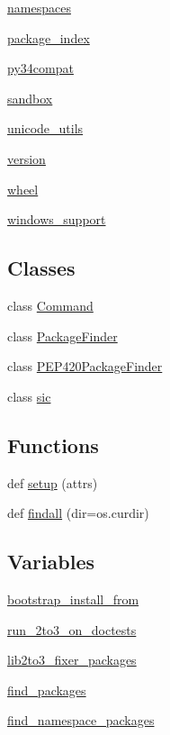 \begin{DoxyCompactItemize}
\item 
 \hyperlink{namespacesetuptools_1_1namespaces}{namespaces}
\item 
 \hyperlink{namespacesetuptools_1_1package__index}{package\+\_\+index}
\item 
 \hyperlink{namespacesetuptools_1_1py34compat}{py34compat}
\item 
 \hyperlink{namespacesetuptools_1_1sandbox}{sandbox}
\item 
 \hyperlink{namespacesetuptools_1_1unicode__utils}{unicode\+\_\+utils}
\item 
 \hyperlink{namespacesetuptools_1_1version}{version}
\item 
 \hyperlink{namespacesetuptools_1_1wheel}{wheel}
\item 
 \hyperlink{namespacesetuptools_1_1windows__support}{windows\+\_\+support}
\end{DoxyCompactItemize}
\subsection*{Classes}
\begin{DoxyCompactItemize}
\item 
class \hyperlink{classsetuptools_1_1Command}{Command}
\item 
class \hyperlink{classsetuptools_1_1PackageFinder}{Package\+Finder}
\item 
class \hyperlink{classsetuptools_1_1PEP420PackageFinder}{P\+E\+P420\+Package\+Finder}
\item 
class \hyperlink{classsetuptools_1_1sic}{sic}
\end{DoxyCompactItemize}
\subsection*{Functions}
\begin{DoxyCompactItemize}
\item 
def \hyperlink{namespacesetuptools_ad048bb82cb20bf61541da45950f1f4cb}{setup} (attrs)
\item 
def \hyperlink{namespacesetuptools_a9d3e6b5f82f1d22fb1d7ad0daf6018f6}{findall} (dir=os.\+curdir)
\end{DoxyCompactItemize}
\subsection*{Variables}
\begin{DoxyCompactItemize}
\item 
\hyperlink{namespacesetuptools_a7d51d85e64a02e0808685340753eec38}{bootstrap\+\_\+install\+\_\+from}
\item 
\hyperlink{namespacesetuptools_a02cbd18fe112cad981fe27383fd1ee93}{run\+\_\+2to3\+\_\+on\+\_\+doctests}
\item 
\hyperlink{namespacesetuptools_ab9549f600e3f3e095fc7b60354269255}{lib2to3\+\_\+fixer\+\_\+packages}
\item 
\hyperlink{namespacesetuptools_af3f752d8ed43dd0bf1640292cf7f2540}{find\+\_\+packages}
\item 
\hyperlink{namespacesetuptools_aca679eba14fa84f44af47d19f837694b}{find\+\_\+namespace\+\_\+packages}
\end{DoxyCompactItemize}


